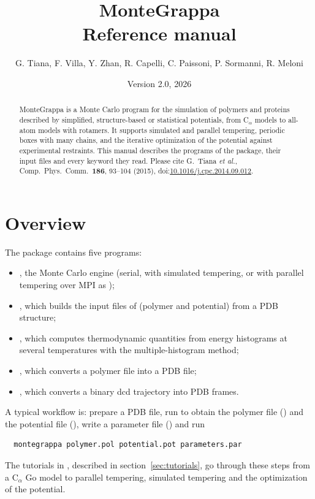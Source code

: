 \documentclass[11pt,a4paper]{article}
\title{\textbf{MonteGrappa}\\[2mm]\large Reference manual}
\author{G. Tiana, F. Villa, Y. Zhan, R. Capelli, C. Paissoni, P. Sormanni, R. Meloni}
\date{Version 2.0, 2026}
\begin{document}
\maketitle

\begin{abstract}
MonteGrappa is a Monte Carlo program for the simulation of polymers and
proteins described by simplified, structure-based or statistical
potentials, from C$_\alpha$ models to all-atom models with rotamers. It
supports simulated and parallel tempering, periodic boxes with many chains,
and the iterative optimization of the potential against experimental
restraints. This manual describes the programs of the package, their input
files and every keyword they read. Please cite G.~Tiana \emph{et al.},
Comp.\ Phys.\ Comm.\ \textbf{186}, 93--104 (2015),
doi:\href{https://doi.org/10.1016/j.cpc.2014.09.012}{10.1016/j.cpc.2014.09.012}.
\end{abstract}

\tableofcontents

\section{Overview}

The package contains five programs:
\begin{itemize}
\item {}, the Monte Carlo engine (serial, with simulated
  tempering, or with parallel tempering over MPI as );
\item {}, which builds the input files of  (polymer
  and potential) from a PDB structure;
\item {}, which computes thermodynamic quantities from energy
  histograms at several temperatures with the multiple-histogram method;
\item {}, which converts a polymer file into a PDB file;
\item {}, which converts a binary dcd trajectory into PDB frames.
\end{itemize}

A typical workflow is: prepare a PDB file, run  to obtain the
polymer file () and the potential file (), write a
parameter file () and run
\begin{Verbatim}
  montegrappa polymer.pol potential.pot parameters.par
\end{Verbatim}
The tutorials in , described in section~\ref{sec:tutorials},
go through these steps from a C$_\alpha$ Go model to parallel tempering,
simulated tempering and the optimization of the potential.
\end{document}
